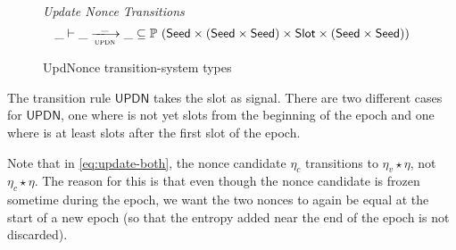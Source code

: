 \begin{figure}
  \emph{Update Nonce Transitions}
  \begin{equation*}
    \_ \vdash \var{\_} \trans{updn}{\_} \var{\_} \subseteq
    \powerset (\Seed \times (\Seed\times\Seed) \times \Slot \times (\Seed\times\Seed))
  \end{equation*}
  \caption{UpdNonce transition-system types}
  \label{fig:ts-types:updnonce}
\end{figure}

The transition rule $\mathsf{UPDN}$ takes the slot  as signal.
There are two different cases for $\mathsf{UPDN}$, one where  is not yet
\SlotsPrior{} slots from the beginning of the epoch and one where  is at least
\SlotsPrior{} slots after the first slot of the epoch.

Note that in \ref{eq:update-both}, the nonce candidate $\eta_c$ transitions to
$\eta_v\star\eta$, not $\eta_c\star\eta$. The reason for this is that even though the nonce
candidate is frozen sometime during the epoch, we want the two nonces to again be equal at the
start of a new epoch (so that the entropy added near the end of the epoch is not discarded).


